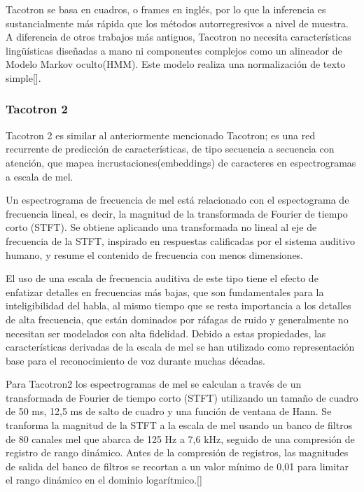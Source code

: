Tacotron se basa en cuadros, o frames en inglés, por lo que la inferencia es sustancialmente más rápida que los métodos autorregresivos a nivel de muestra. A diferencia de otros trabajos más antiguos, Tacotron no necesita características lingüísticas diseñadas a mano ni componentes complejos como un alineador de Modelo Markov oculto(HMM). Este modelo realiza una
normalización de texto simple[\cite{wang2017tacotron}].


\subsubsection{Tacotron 2}

Tacotron 2 es similar al anteriormente mencionado Tacotron; es una red recurrente de predicción de características, de tipo secuencia a secuencia con atención, que mapea incrustaciones(embeddings) de caracteres en espectrogramas a escala de mel. 

Un espectrograma de frecuencia de mel está relacionado con el espectograma de frecuencia lineal, es decir, la magnitud de la transformada de Fourier de tiempo corto (STFT). Se obtiene aplicando una transformada no lineal al eje de frecuencia de la STFT, inspirado en respuestas calificadas por el sistema auditivo humano, y resume el contenido de frecuencia con menos dimensiones.

El uso de una escala de frecuencia auditiva de este tipo tiene el efecto de enfatizar detalles en frecuencias más bajas, que son fundamentales para la inteligibilidad del habla, al mismo tiempo que se resta importancia a los detalles de alta frecuencia, que están dominados por ráfagas de ruido y generalmente no necesitan ser modelados con alta fidelidad. Debido a estas propiedades, las características derivadas de la escala de mel se han utilizado como representación base para el reconocimiento de voz durante muchas décadas. 

Para Tacotron2 los espectrogramas de mel se calculan a través de un transformada de Fourier de tiempo corto (STFT) utilizando un tamaño de cuadro de 50 ms, 12,5 ms de salto de cuadro y una función de ventana de Hann. Se tranforma la magnitud de la STFT a la escala de mel usando un banco de filtros de 80 canales mel que abarca de 125 Hz a 7,6 kHz, seguido de una compresión de registro de rango dinámico. Antes de la compresión de registros, las magnitudes de salida del banco de filtros se recortan a un valor mínimo de 0,01 para limitar el rango dinámico en el dominio logarítmico.[\cite{shen2018natural}] \\

